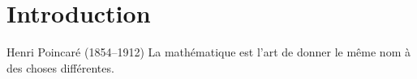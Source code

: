 \chapter{Introduction}\label{ch:introduction}


\begin{chapquote}{Henri Poincaré (1854--1912)}
La mathématique est l'art de donner le même nom à des choses différentes.
\end{chapquote}

\lipsum[1-3]




\cleardoublepage

